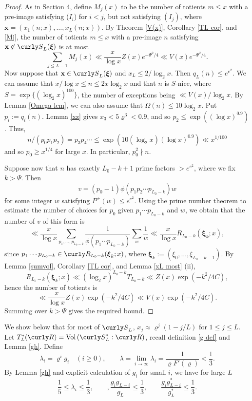 \documentclass[11pt]{amsart}
\theoremstyle{remark}
\theoremstyle{plain}
\numberwithin{equation}{section}
\newcommand{\be}{\begin{equation}}
\newcommand{\ee}{\end{equation}}
\newcommand{\lam}{\ensuremath{\lambda}}
\renewcommand{\(}{\left(}
\renewcommand{\)}{\right)}
\newcommand{\fancyS}{{\curly S}}
\renewcommand{\le}{\leqslant}
\renewcommand{\leq}{\leqslant}
\renewcommand{\ge}{\geqslant}
\renewcommand{\geq}{\geqslant}
\renewcommand{\rho}{\varrho}
\newcommand{\bxi}{\boldsymbol\xi}
\newcommand{\vxi}{\bxi}
\newcommand{\vx}{\mathbf{x}}
\DeclareMathOperator{\vvol}{Vol}
\begin{document}
\begin{proof}  As in Section 4, define $M_j(x)$ to be the number of totients
$m\le x$ with a pre-image satisfying ($I_i$) for $i<j$, but not satisfying
$(I_j)$, where
$\vx=(x_1(n;x), \ldots, x_{L}(n;x)).$
By  Theorem \ref{V(x)}, Corollary \ref{TL cor}, and
 \eqref{Mj}, the number of totients
$m\le x$ with a pre-image $n$ satisfying 
$\vx \not\in \fancyS_L(\vxi)$ is at most
\[
\sum_{j\le L-1} M_j(x) \ll \frac{x}{\log x} Z(x) e^{-\Psi^2/4} \ll 
V(x) e^{-\Psi^2/4}.
\]
Now suppose that $\vx \in \fancyS_L(\vxi)$ and $x_L\le
2/\log_2 x$.  Then $q_L(n) \le e^{e^2}$.
We can assume that $x/\log{x} \leq n \leq 2x\log_2{x}$ and that $n$ is $S$-nice, where
$S=\exp\{(\log_2 x)^{100} \}$, the number of exceptions being $\ll V(x)/\log_2 x$.
By Lemma \ref{Omega lem},
we can also assume that $\Omega(n) \leq 10\log_2{x}$. Put $p_i := q_i(n)$. 
 Lemma \ref{xz} gives $x_3 < 5 \rho^3 < 0.9$, and so $p_2 \leq \exp((\log{x})^{0.9})$. Thus,
\[ 
n/(p_0 p_1 p_2) = p_3 p_4 \cdots \leq \exp(10 (\log_2{x}) (\log{x})^{0.9}) \ll x^{1/100} 
\]
and so $p_0 \geq x^{1/4}$  for large $x$. In particular, $p_0^2 \nmid n$.

Suppose now that $n$ has exactly $L_0-k+1$  prime factors $> e^{e^2}$, 
where we fix $k > \Psi$. Then
\[ 
v = (p_0-1)\phi(p_1 p_2 \cdots p_{L_0-k}) w 
\]
for some integer $w$ satisfying $P^+(w)\le e^{e^2}$. 
Using the prime number theorem to estimate the number of 
choices for $p_0$ given $p_1 \cdots p_{L_0-k}$ and $w$, we obtain that the number of $v$ 
of this form is
\[ 
\ll \frac{x}{\log{x}} \sum_{p_1, \ldots, p_{L_0-k}}\frac{1}{\phi(p_1 \cdots p_{L_0-k})} 
\sum_{w} \frac{1}{w} \ll  \frac{x}{\log{x}} R_{L_0-k}(\vxi_k; x),
\]
since
$p_1 \cdots p_{L_0-k} \in \curly R_{L_0-k}(\vxi_k; x)$, 
where $\vxi_k:= (\xi_0, \dots, \xi_{L_0-k-1})$. 
By Lemma \ref{sumvol},  Corollary \ref{TL cor}, and Lemma \ref{xL most} (ii),
\[  
R_{L_0-k}(\vxi_k; x) \ll (\log_2{x})^{L_0-k} T_{L_0-k} 
\ll Z(x) \exp(-k^2/4C),
\]
hence the number of totients is
\[ \ll \frac{x}{\log{x}} Z(x) \exp(-k^2/4C) \ll V(x) \exp(-k^2/4C).  \]
Summing over $k > \Psi$ gives the required bound.
\end{proof}


We show below that for most of $\fancyS_L$, 
$x_j \approx \rho^j (1-j/L)$ for $1\le j\le L$.
Let $T_L^*(\curly R) = \vvol\left( \fancyS_L^* : \curly R \right)$, recall
definition
\eqref{g def} and Lemma \ref{gh}. Define
\be\label{lambda def}
\lambda_i=\rho^i g_i \quad (i\ge 0),
\qquad\lambda = \lim_{i\to\infty} \lambda_i =\frac
{1}{\rho F'(\rho)} < \frac13.
\ee
By Lemma \ref{gh} and explicit calculation of $g_i$ for small $i$, we have for large $L$
\be\label{gi13}
\frac15 \le \lam_i \le \frac13, \qquad,
\frac{g_i g_{L-i}}{g_L} \le \frac13, \qquad \frac{g_i g_{L-i}^*}{g_L^*} \le \frac13.
\ee
\end{document}
